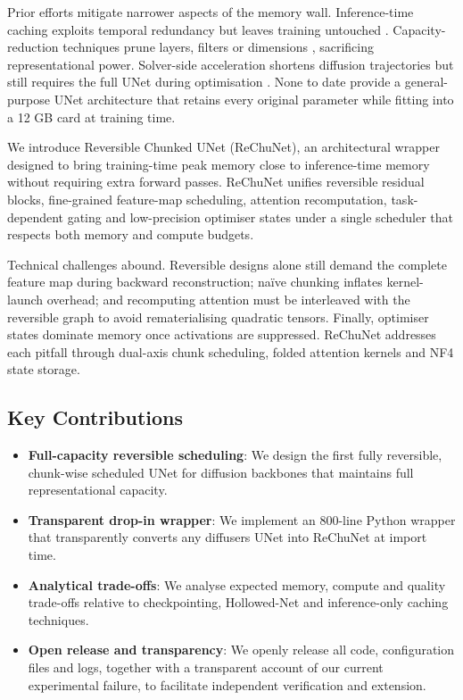 \documentclass{article}
\begin{document}
Prior efforts mitigate narrower aspects of the memory wall. Inference-time caching exploits temporal redundancy but leaves training untouched \cite{ma-2023-deepcache,wimbauer-2023-cache,zhan-2024-fast}. Capacity-reduction techniques prune layers, filters or dimensions \cite{cho-2024-hollowed,fang-2023-structural,zhang-2022-dimensionality}, sacrificing representational power. Solver-side acceleration shortens diffusion trajectories but still requires the full UNet during optimisation \cite{salimans-2024-multistep,li-2023-snapfusion}. None to date provide a general-purpose UNet architecture that retains every original parameter while fitting into a 12 GB card at training time.

We introduce Reversible Chunked UNet (ReChuNet), an architectural wrapper designed to bring training-time peak memory close to inference-time memory without requiring extra forward passes. ReChuNet unifies reversible residual blocks, fine-grained feature-map scheduling, attention recomputation, task-dependent gating and low-precision optimiser states under a single scheduler that respects both memory and compute budgets.

Technical challenges abound. Reversible designs alone still demand the complete feature map during backward reconstruction; naïve chunking inflates kernel-launch overhead; and recomputing attention must be interleaved with the reversible graph to avoid rematerialising quadratic tensors. Finally, optimiser states dominate memory once activations are suppressed. ReChuNet addresses each pitfall through dual-axis chunk scheduling, folded attention kernels and NF4 state storage.

\subsection{Key Contributions}
\begin{itemize}
\item \textbf{Full-capacity reversible scheduling}: We design the first fully reversible, chunk-wise scheduled UNet for diffusion backbones that maintains full representational capacity.
\item \textbf{Transparent drop-in wrapper}: We implement an 800-line Python wrapper that transparently converts any diffusers UNet into ReChuNet at import time.
\item \textbf{Analytical trade-offs}: We analyse expected memory, compute and quality trade-offs relative to checkpointing, Hollowed-Net and inference-only caching techniques.
\item \textbf{Open release and transparency}: We openly release all code, configuration files and logs, together with a transparent account of our current experimental failure, to facilitate independent verification and extension.
\end{itemize}
\end{document}
